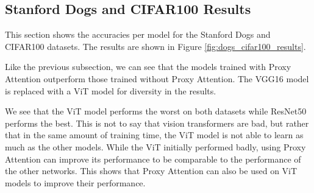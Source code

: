 \documentclass[a4paper,11pt,openright]{book}
\begin{document}
\subsection{Stanford Dogs and CIFAR100 Results}
This section shows the accuracies per model for the Stanford Dogs \cite{khoslaNovelDatasetFineGrained} and CIFAR100 \cite{krizhevskyLearningMultipleLayers} datasets. The results are shown in Figure \ref{fig:dogs_cifar100_results}.

Like the previous subsection, we can see that the models trained with Proxy Attention outperform those trained without Proxy Attention. The VGG16 \cite{simonyanVeryDeepConvolutional2014} model is replaced with a ViT model for diversity in the results. 

We see that the ViT model performs the worst on both datasets while ResNet50 \cite{heDeepResidualLearning2016} performs the best. This is not to say that vision transformers are bad, but rather that in the same amount of training time, the ViT model is not able to learn as much as the other models. 
While the ViT initially performed badly, using Proxy Attention can improve its performance to be comparable to the performance of the other networks. This shows that Proxy Attention can also be used on ViT models to improve their performance.
\end{document}
